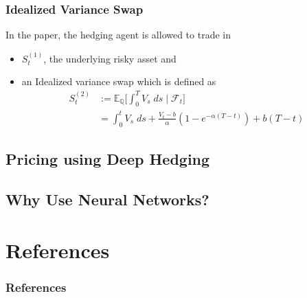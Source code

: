 \documentclass[serif]{beamer}
\def\E{{\mathbb E}}
\def\cF{{\mathcal F}}
\begin{document}
\begin{frame}
    \frametitle{Idealized Variance Swap}
    In the paper, the hedging agent is allowed to trade in
    \begin{itemize}
        \item $S^{(1)}_t$, the underlying risky asset and
        \item an Idealized variance swap which is defined as
              \begin{align*}
                  S^{(2)}_t & := \E_{\mathbb{Q}} \Big [
                      \int_0^T V_s \; ds \; \Big | \; \cF_t
                  \Big ]                                \\
                            & = \int_0^t V_s \; ds
                  + \frac{V_t - b}{\alpha} (
                  1 - e^{-\alpha(T-t)}
                  ) + b(T-t)
              \end{align*}
    \end{itemize}
\end{frame}

\subsection{Pricing using Deep Hedging}
\subsection{Why Use Neural Networks?}

\section{References}
\begin{frame}
    \frametitle{References}
    
    
\end{frame}
\end{document}
